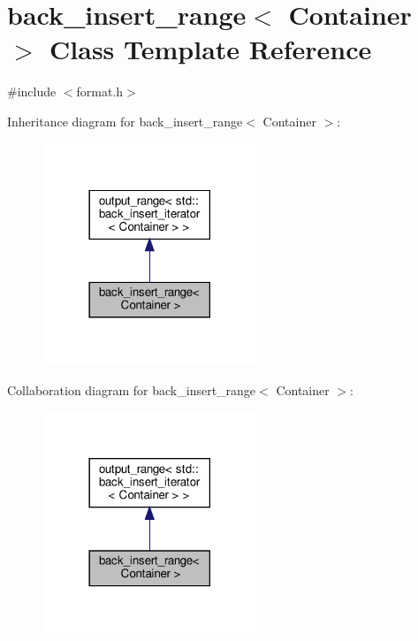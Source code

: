 \hypertarget{classback__insert__range}{}\section{back\+\_\+insert\+\_\+range$<$ Container $>$ Class Template Reference}
\label{classback__insert__range}


{\ttfamily \#include $<$format.\+h$>$}



Inheritance diagram for back\+\_\+insert\+\_\+range$<$ Container $>$\+:
\nopagebreak
\begin{figure}[H]
\begin{center}
\leavevmode
\includegraphics[width=182pt]{classback__insert__range__inherit__graph}
\end{center}
\end{figure}


Collaboration diagram for back\+\_\+insert\+\_\+range$<$ Container $>$\+:
\nopagebreak
\begin{figure}[H]
\begin{center}
\leavevmode
\includegraphics[width=182pt]{classback__insert__range__coll__graph}
\end{center}
\end{figure}
